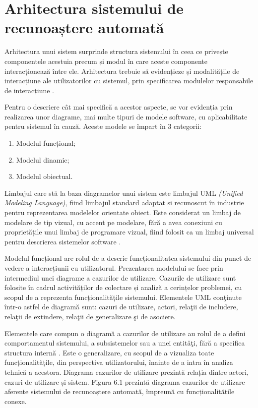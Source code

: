 \documentclass[a4paper,12pt]{report}
\begin{document}
\newpage
\section{Arhitectura sistemului de recunoaștere automată}
Arhitectura unui sistem surprinde structura sistemului în ceea 
ce privește componentele acestuia precum și modul în care 
aceste componente interacționează între ele. Arhitectura trebuie 
să evidențieze și modalitățile de interacțiune ale utilizatorilor 
cu sistemul, prin specificarea modulelor responsabile de interacțiune \cite{Ingineria-sistemelor-de-programare}.

Pentru o descriere cât mai specifică a acestor aspecte, se vor 
evidenția prin realizarea unor diagrame, 
mai multe tipuri de modele software, cu aplicabilitate pentru sistemul în cauză. 
Aceste modele se împart în 3 categorii: 
\begin{enumerate}
    \setlength\itemsep{0.2em}
    \item Modelul funcțional;
    \item Modelul dinamic;
    \item Modelul obiectual.
\end{enumerate}

Limbajul care stă la baza diagramelor 
unui sistem este limbajul UML \emph{(Unified Modeling Language)}, fiind 
limbajul standard adaptat și recunoscut în industrie pentru reprezentarea 
modelelor orientate obiect. Este considerat un limbaj de modelare 
de tip vizual, cu accent pe modelare, fără a avea conexiuni 
cu proprietățile unui limbaj de programare vizual, fiind folosit 
ca un limbaj universal pentru descrierea sistemelor software \cite{Ingineria-sistemelor-de-programare}.

Modelul funcțional are rolul de a descrie funcționalitatea sistemului 
din punct de vedere a interacțiunii cu utilizatorul. Prezentarea modelului 
se face prin intermediul unei diagrame a cazurilor de utilizare. 
Cazurile de utilizare sunt folosite în cadrul activităților de colectare
și analiză a cerințelor problemei, cu scopul de a reprezenta 
funcționalitățile sistemului. 
Elementele UML conţinute într-o astfel de diagramă sunt: cazuri de utilizare, actori, 
relaţii de includere, relaţii de extindere, relaţii de generalizare şi de asociere.

Elementele care compun o diagramă a cazurilor de utilizare au rolul de a defini
comportamentul sistemului, a subsistemelor sau a unei entităţi, fără a specifica
structura internă \cite{Ingineria-sistemelor-de-programare}. Este o generalizare, 
cu scopul de a vizualiza toate funcționalitățile, din perspectiva utilizatorului,
înainte de a intra în analiza tehnică a acestora. 
Diagrama cazurilor de utilizare prezintă relația dintre actori,
cazuri de utilizare și sistem. Figura 6.1 prezintă diagrama cazurilor 
de utilizare aferente sistemului de recunoaștere automată, 
împreună cu funcționalitățile conexe.
\end{document}
